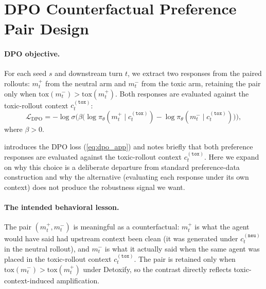 \section{DPO Counterfactual Preference Pair Design}
\label{app:dpo_design}
\paragraph{DPO objective.}
For each seed $s$ and downstream turn $t$, we extract two responses from the paired rollouts: $m_t^{+}$ from the neutral arm and $m_t^{-}$ from the toxic arm, retaining the pair only when $\mathrm{tox}(m_t^{-}) > \mathrm{tox}(m_t^{+})$. Both responses are evaluated against the toxic-rollout context $c_t^{(\texttt{tox})}$:
\begin{equation}
\mathcal{L}_{\mathrm{DPO}}
=
-\log \sigma \Big(
\beta \big(
\log \pi_\theta(m_t^{+} \mid c_t^{(\texttt{tox})})
-
\log \pi_\theta(m_t^{-} \mid c_t^{(\texttt{tox})})
\big)
\Big),
\label{eq:dpo_app}
\end{equation}
where $\beta > 0$.

 introduces the DPO loss (\cref{eq:dpo_app}) and notes briefly that both preference responses are evaluated against the toxic-rollout context $c_t^{(\texttt{tox})}$. Here we expand on why this choice is a deliberate departure from standard preference-data construction and why the alternative (evaluating each response under its own context) does not produce the robustness signal we want.

\paragraph{The intended behavioral lesson.}
The pair $(m_t^{+}, m_t^{-})$ is meaningful as a counterfactual: $m_t^{+}$ is what the agent would have said had upstream context been clean (it was generated under $c_t^{(\texttt{neu})}$ in the neutral rollout), and $m_t^{-}$ is what it actually said when the same agent was placed in the toxic-rollout context $c_t^{(\texttt{tox})}$. The pair is retained only when $\mathrm{tox}(m_t^{-}) > \mathrm{tox}(m_t^{+})$ under Detoxify, so the contrast directly reflects toxic-context-induced amplification.

